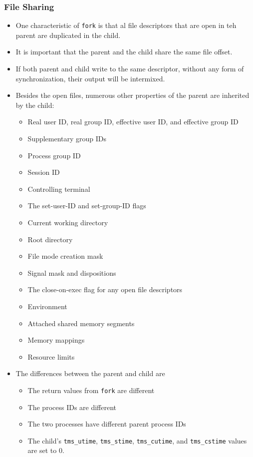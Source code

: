 \documentclass[]{article}
\newcommand{\code}{\texttt}
\begin{document}
\subsubsection*{File Sharing}
\begin{itemize}
\item One characteristic of \code{fork} is that al file descriptors that are
open in teh parent are duplicated in the child.
\item It is important that the parent and the child share the same file offset.
\item If both parent and child write to the same descriptor, without any form of
synchronization, their output will be intermixed.
\item Besides the open files, numerous other properties of the parent are
inherited by the child:
\begin{itemize}
\item Real user ID, real group ID, effective user ID, and effective group ID
\item Supplementary group IDs
\item Process group ID
\item Session ID
\item Controlling terminal
\item The set-user-ID and set-group-ID flags
\item Current working directory
\item Root directory
\item File mode creation mask
\item Signal mask and dispositions
\item The close-on-exec flag for any open file descriptors
\item Environment
\item Attached shared memory segments
\item Memory mappings
\item Resource limits
\end{itemize}
\item The differences between the parent and child are
\begin{itemize}
\item The return values from \code{fork} are different
\item The process IDs are different
\item The two processes have different parent process IDs
\item The child's \code{tms\_utime}, \code{tms\_stime}, \code{tms\_cutime}, and
\code{tms\_cstime} values are set to 0.

\end{itemize}
\end{itemize}
\end{document}
